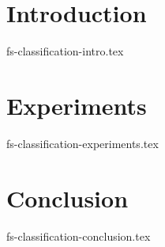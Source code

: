 \documentclass[sigconf]{acmart}
\theoremstyle{remark}
\begin{document}
\thispagestyle{empty}

\section {Introduction}
 {fs-classification-intro.tex}

\section {Experiments}
 {fs-classification-experiments.tex}

\section {Conclusion}
 {fs-classification-conclusion.tex}



\end{document}
